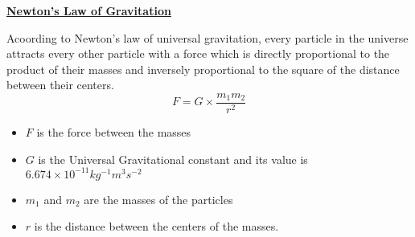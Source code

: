 \begin{center}
\Large{\textbf{\underline{Newton's Law of Gravitation}}}
\end{center}
Acoording to Newton's law of universal gravitation, every particle in the universe attracts every other particle with a force which is directly proportional to the product of their masses and inversely proportional to the square of the distance between their centers.
\begin{equation}
F = G \times \frac{m_1 m_2}{r^2}  
\end{equation}
\begin{itemize}
  \item $F$ is the force between the masses
  \item $G$ is the Universal Gravitational constant and its value is $6.674 \times 10 ^{-11}  kg^{-1}m^{3}s^{-2}$
  \item $m_1$ and $m_2$ are the masses of the particles
  \item $r$ is the distance between the centers of the masses.
\end{itemize}


